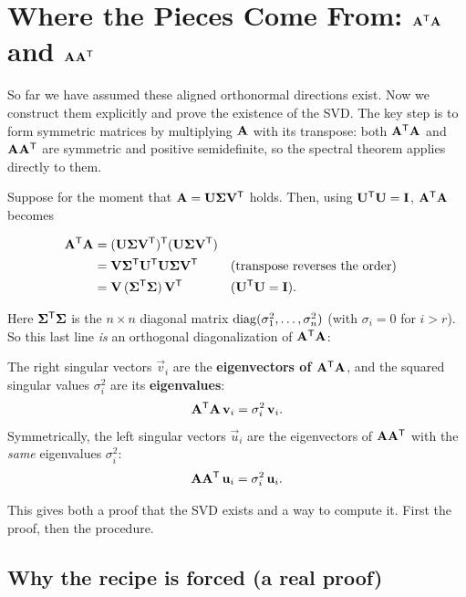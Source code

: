 \section{Where the Pieces Come From: $\mathbf{A}^{\mathsf{T}}\mathbf{A}$ and $\mathbf{A}\mathbf{A}^{\mathsf{T}}$}
\label{ch29:ata-aat}

So far we have assumed these aligned orthonormal directions exist. Now we construct them explicitly
and prove the existence of the SVD. The key step is to form symmetric matrices by multiplying
$\mathbf{A}$ with its transpose: both $\mathbf{A}^{\mathsf{T}}\mathbf{A}$ and $\mathbf{A}\mathbf{A}^{\mathsf{T}}$ are symmetric and
positive semidefinite, so the spectral theorem applies directly to them.

Suppose for the moment that $\mathbf{A} = \mathbf{U}\mathbf{\Sigma}\mathbf{V}^{\mathsf{T}}$ holds.
Then, using $\mathbf{U}^{\mathsf{T}}\mathbf{U} = \mathbf{I}$, $\mathbf{A}^{\mathsf{T}}\mathbf{A}$ becomes

\begin{align*}
  \mathbf{A}^{\mathsf{T}}\mathbf{A}
  &= (\mathbf{U}\mathbf{\Sigma}\mathbf{V}^{\mathsf{T}})^{\mathsf{T}}(\mathbf{U}\mathbf{\Sigma}\mathbf{V}^{\mathsf{T}}) \\
  &= \mathbf{V}\mathbf{\Sigma}^{\mathsf{T}}\mathbf{U}^{\mathsf{T}}\mathbf{U}\mathbf{\Sigma}\mathbf{V}^{\mathsf{T}}
     && \text{(transpose reverses the order)} \\
  &= \mathbf{V}\,(\mathbf{\Sigma}^{\mathsf{T}}\mathbf{\Sigma})\,\mathbf{V}^{\mathsf{T}}
     && \text{($\mathbf{U}^{\mathsf{T}}\mathbf{U} = \mathbf{I}$)}.
\end{align*}

Here $\mathbf{\Sigma}^{\mathsf{T}}\mathbf{\Sigma}$ is the $n\times n$ diagonal matrix
$\operatorname{diag}(\sigma_1^2,\dots,\sigma_n^2)$ (with $\sigma_i = 0$ for $i > r$). So this last line \emph{is} an
orthogonal diagonalization of $\mathbf{A}^{\mathsf{T}}\mathbf{A}$:

\begin{focusbox}
The right singular vectors $\vec{v}_i$ are the \textbf{eigenvectors of
$\mathbf{A}^{\mathsf{T}}\mathbf{A}$}, and the squared singular values $\sigma_i^2$ are its
\textbf{eigenvalues}:
\[
  \mathbf{A}^{\mathsf{T}}\mathbf{A}\,\mathbf{v}_i = \sigma_i^2\, \mathbf{v}_i.
\]
Symmetrically, the left singular vectors $\vec{u}_i$ are the eigenvectors of
$\mathbf{A}\mathbf{A}^{\mathsf{T}}$ with the \emph{same} eigenvalues $\sigma_i^2$:
\[
  \mathbf{A}\mathbf{A}^{\mathsf{T}}\,\mathbf{u}_i = \sigma_i^2\, \mathbf{u}_i.
\]
\end{focusbox}

This gives both a proof that the SVD exists and a way to compute it. First
the proof, then the procedure.

\subsection{Why the recipe is forced (a real proof)}

